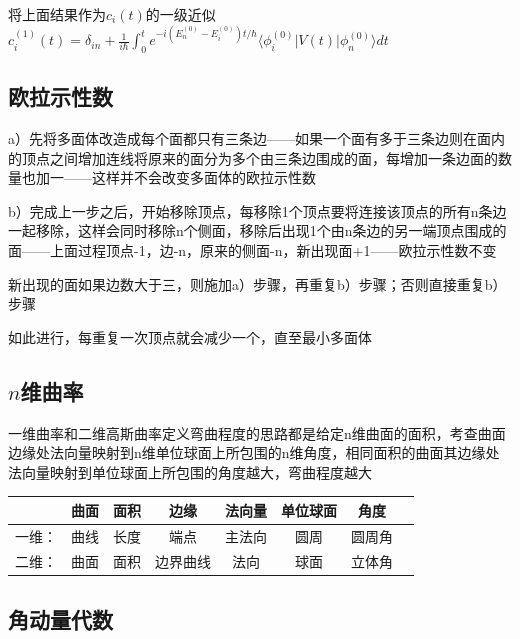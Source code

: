 将上面结果作为$c_i(t)$的一级近似
$c_i^{(1)}(t) = \delta_{in} + \frac{1}{i\hbar} \int_{0}^{t} e^{-i(E^{(0)}_n - E^{(0)}_i) t/\hbar} \langle \phi^{(0)}_i| V(t) |\phi^{(0)}_n\rangle dt$

%
%
%

\subsection{欧拉示性数}

a）先将多面体改造成每个面都只有三条边——如果一个面有多于三条边则在面内的顶点之间增加连线将原来的面分为多个由三条边围成的面，每增加一条边面的数量也加一——这样并不会改变多面体的欧拉示性数

b）完成上一步之后，开始移除顶点，每移除1个顶点要将连接该顶点的所有n条边一起移除，这样会同时移除n个侧面，移除后出现1个由n条边的另一端顶点围成的面——上面过程顶点-1，边-n，原来的侧面-n，新出现面+1——欧拉示性数不变

新出现的面如果边数大于三，则施加a）步骤，再重复b）步骤；否则直接重复b）步骤

如此进行，每重复一次顶点就会减少一个，直至最小多面体

\subsection{$n$维曲率}

一维曲率和二维高斯曲率定义弯曲程度的思路都是给定n维曲面的面积，考查曲面边缘处法向量映射到n维单位球面上所包围的n维角度，相同面积的曲面其边缘处法向量映射到单位球面上所包围的角度越大，弯曲程度越大

\bigskip

\begin{tabular}{c|ccccccc}
          &曲面  &面积  &边缘    &法向量  &单位球面  &角度\\
    \hline
    一维：&曲线  &长度  &端点     &主法向  &圆周  &圆周角\\
    二维：&曲面  &面积  &边界曲线  &法向  &球面  &立体角\\
\end{tabular}


\subsection{角动量代数}


